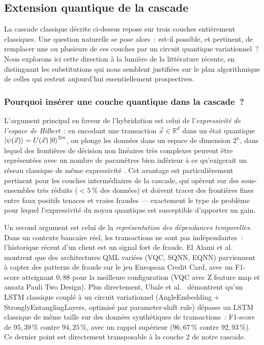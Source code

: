 \documentclass[a4paper]{article}
\begin{document}
\subsection{Extension quantique de la cascade}
\label{subsec:cascade-quantique}
 
La cascade classique décrite ci-dessus repose sur trois couches entièrement classiques. Une question naturelle se pose alors~: est-il possible, et pertinent, de remplacer une ou plusieurs de ces couches par un circuit quantique variationnel~? Nous explorons ici cette direction à la lumière de la littérature récente, en distinguant les substitutions qui nous semblent justifiées sur le plan algorithmique de celles qui restent aujourd'hui essentiellement prospectives.
 
\subsubsection{Pourquoi insérer une couche quantique dans la cascade~?}
 
L'argument principal en faveur de l'hybridation est celui de l'\emph{expressivité de l'espace de Hilbert}~: en encodant une transaction $\vec{x} \in \mathbb{R}^d$ dans un état quantique $\ket{\psi(\vec{x})} = U(\vec{x})\ket{0}^{\otimes n}$, on plonge les données dans un espace de dimension $2^n$, dans lequel des frontières de décision non linéaires très complexes peuvent être représentées avec un nombre de paramètres bien inférieur à ce qu'exigerait un réseau classique de même expressivité \cite{havlicek2019, schuld2019qml}. Cet avantage est particulièrement pertinent pour les couches intermédiaires de la cascade, qui opèrent sur des sous-ensembles très réduits ($< 5\,\%$ des données) et doivent tracer des frontières fines entre faux positifs tenaces et vraies fraudes --- exactement le type de problème pour lequel l'expressivité du noyau quantique est susceptible d'apporter un gain.
 
Un second argument est celui de la \emph{représentation des dépendances temporelles}. Dans un contexte bancaire réel, les transactions ne sont pas indépendantes~: l'historique récent d'un client est un signal fort de fraude. El Alami et al.~\cite{elalami2026} montrent que des architectures QML variées (VQC, SQNN, EQNN) parviennent à capter des patterns de fraude sur le jeu European Credit Card, avec un F1-score atteignant $0{,}88$ pour la meilleure configuration (VQC avec Z feature map et ansatz Pauli Two Design). Plus directement, Ubale et al.~\cite{qlstm2025} démontrent qu'un LSTM classique couplé à un circuit variationnel (AngleEmbedding + StronglyEntanglingLayers, optimisé par parameter-shift rule) dépasse un LSTM classique de même taille sur des données synthétiques de transactions~: F1-score de $95{,}39\,\%$ contre $94{,}25\,\%$, avec un rappel supérieur ($96{,}67\,\%$ contre $92{,}93\,\%$). Ce dernier point est directement transposable à la couche 2 de notre cascade.
 
\end{document}
